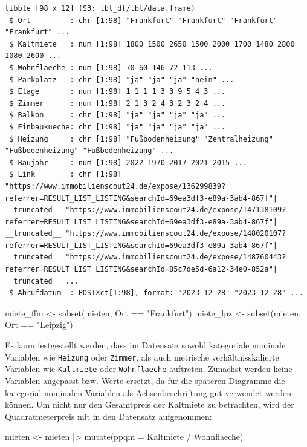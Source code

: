 \documentclass[
  a4paper,
  DIV=11]{scrartcl}
\newenvironment{Shaded}{\begin{snugshade}}{\end{snugshade}}
\newcommand{\AttributeTok}[1]{\textcolor[rgb]{0.40,0.45,0.13}{#1}}
\newcommand{\FunctionTok}[1]{\textcolor[rgb]{0.28,0.35,0.67}{#1}}
\newcommand{\NormalTok}[1]{\textcolor[rgb]{0.00,0.23,0.31}{#1}}
\newcommand{\OtherTok}[1]{\textcolor[rgb]{0.00,0.23,0.31}{#1}}
\newcommand{\SpecialCharTok}[1]{\textcolor[rgb]{0.37,0.37,0.37}{#1}}
\newcommand{\StringTok}[1]{\textcolor[rgb]{0.13,0.47,0.30}{#1}}
\begin{document}
\begin{verbatim}
tibble [98 x 12] (S3: tbl_df/tbl/data.frame)
 $ Ort         : chr [1:98] "Frankfurt" "Frankfurt" "Frankfurt" "Frankfurt" ...
 $ Kaltmiete   : num [1:98] 1800 1500 2650 1500 2000 1700 1480 2800 1080 2600 ...
 $ Wohnflaeche : num [1:98] 70 60 146 72 113 ...
 $ Parkplatz   : chr [1:98] "ja" "ja" "ja" "nein" ...
 $ Etage       : num [1:98] 1 1 1 1 3 3 9 5 4 3 ...
 $ Zimmer      : num [1:98] 2 1 3 2 4 3 2 3 2 4 ...
 $ Balkon      : chr [1:98] "ja" "ja" "ja" "ja" ...
 $ Einbaukueche: chr [1:98] "ja" "ja" "ja" "ja" ...
 $ Heizung     : chr [1:98] "Fußbodenheizung" "Zentralheizung" "Fußbodenheizung" "Fußbodenheizung" ...
 $ Baujahr     : num [1:98] 2022 1970 2017 2021 2015 ...
 $ Link        : chr [1:98] "https://www.immobilienscout24.de/expose/136299839?referrer=RESULT_LIST_LISTING&searchId=69ea3df3-e89a-3ab4-867f"| __truncated__ "https://www.immobilienscout24.de/expose/147138109?referrer=RESULT_LIST_LISTING&searchId=69ea3df3-e89a-3ab4-867f"| __truncated__ "https://www.immobilienscout24.de/expose/148020107?referrer=RESULT_LIST_LISTING&searchId=69ea3df3-e89a-3ab4-867f"| __truncated__ "https://www.immobilienscout24.de/expose/148760443?referrer=RESULT_LIST_LISTING&searchId=85c7de5d-6a12-34e0-852a"| __truncated__ ...
 $ Abrufdatum  : POSIXct[1:98], format: "2023-12-28" "2023-12-28" ...
\end{verbatim}

\begin{Shaded}
\begin{Highlighting}[]
\NormalTok{miete\_ffm }\OtherTok{\textless{}{-}} \FunctionTok{subset}\NormalTok{(mieten, Ort }\SpecialCharTok{==} \StringTok{"Frankfurt"}\NormalTok{)}
\NormalTok{miete\_lpz }\OtherTok{\textless{}{-}} \FunctionTok{subset}\NormalTok{(mieten, Ort }\SpecialCharTok{==} \StringTok{"Leipzig"}\NormalTok{)}
\end{Highlighting}
\end{Shaded}

Es kann festgestellt werden, dass im Datensatz sowohl kategoriale
nominale Variablen wie \texttt{Heizung} oder \texttt{Zimmer}, als auch
metrische verhältnisskalierte Variablen wie \texttt{Kaltmiete} oder
\texttt{Wohnflaeche} auftreten. Zunächst werden keine Variablen
angepasst bzw. Werte ersetzt, da für die späteren Diagramme die
kategorial nominalen Variablen als Achsenbeschriftung gut verwendet
werden können. Um nicht nur den Gesamtpreis der Kaltmiete zu betrachten,
wird der Quadratmeterpreis mit in den Datensatz aufgenommen:

\begin{Shaded}
\begin{Highlighting}[]
\NormalTok{mieten }\OtherTok{\textless{}{-}}\NormalTok{ mieten }\SpecialCharTok{|\textgreater{}}
  \FunctionTok{mutate}\NormalTok{(}\AttributeTok{ppqm =}\NormalTok{ Kaltmiete }\SpecialCharTok{/}\NormalTok{ Wohnflaeche)}
\end{Highlighting}
\end{Shaded}
\end{document}
